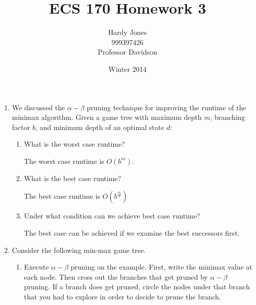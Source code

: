 \documentclass[12pt,letterpaper]{article}
\title{ECS 170 Homework 3\vspace{-2ex}}
\author{Hardy Jones\\
        999397426\\
        Professor Davidson\vspace{-2ex}}
\date{Winter 2014}
\begin{document}
  \maketitle

  \begin{enumerate}
    \item
      We discussed the $\alpha-\beta$ pruning technique for improving the runtime of the minimax algorithm.
      Given a game tree with maximum depth $m$, branching factor $b$, and minimum depth of an optimal state $d$:

      \begin{enumerate}
        \item What is the worst case runtime?

          The worst case runtime is $O(b^m)$.
        \item What is the best case runtime?

          The best case runtime is $O(b^\frac{m}{2})$
        \item Under what condition can we achieve best case runtime?

          The best case can be achieved if we examine the best successors first.
      \end{enumerate}
    \item
      Consider the following min-max game tree.

      \begin{enumerate}
        \item
          Execute $\alpha-\beta$ pruning on the example.
          First, write the minimax value at each node.
          Then cross out the branches that get pruned by $\alpha-\beta$ pruning.
          If a branch does get pruned, circle the nodes under that branch that you had to explore in order to decide to prune the branch.
      \end{enumerate}
  \end{enumerate}
\end{document}
